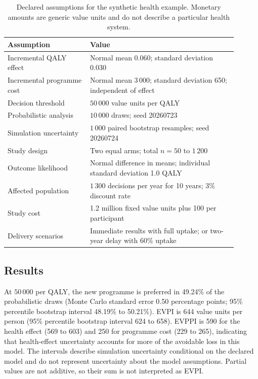 \begin{table}[!ht]
\centering
\footnotesize
\begin{tabular}{p{0.32\linewidth}p{0.58\linewidth}}
\toprule
Assumption & Value \\
\midrule
Incremental QALY effect & Normal mean 0.060; standard deviation 0.030 \\
Incremental programme cost & Normal mean $3\,000$; standard deviation 650; independent of effect \\
Decision threshold & $50\,000$ value units per QALY \\
Probabilistic analysis & $10\,000$ draws; seed 20260723 \\
Simulation uncertainty & $1\,000$ paired bootstrap resamples; seed 20260724 \\
Study design & Two equal arms; total $n=50$ to $1\,200$ \\
Outcome likelihood & Normal difference in means; individual standard deviation 1.0 QALY \\
Affected population & $1\,300$ decisions per year for 10 years; 3\% discount rate \\
Study cost & 1.2 million fixed value units plus 100 per participant \\
Delivery scenarios & Immediate results with full uptake; or two-year delay with 60\% uptake \\
\bottomrule
\end{tabular}
\caption{Declared assumptions for the synthetic health example. Monetary
amounts are generic value units and do not describe a particular health
system.}\label{tab:health-assumptions}
\end{table}
\FloatBarrier{}

\subsection{Results}

At $50\,000$ per QALY, the new programme is preferred in 49.24\% of the
probabilistic draws (Monte Carlo standard error 0.50 percentage points; 95\%
percentile bootstrap interval 48.19\% to 50.21\%). EVPI is 644 value units per
person (95\% percentile bootstrap interval 624 to 658). EVPPI is 590 for the health effect
(569 to 603) and 250 for programme cost (229 to 265), indicating that
health-effect uncertainty accounts for more of the avoidable loss in this
model. The intervals describe simulation uncertainty conditional on the
declared model and do not represent uncertainty about the model assumptions.
Partial values are not additive, so their sum is not interpreted as EVPI\@.

